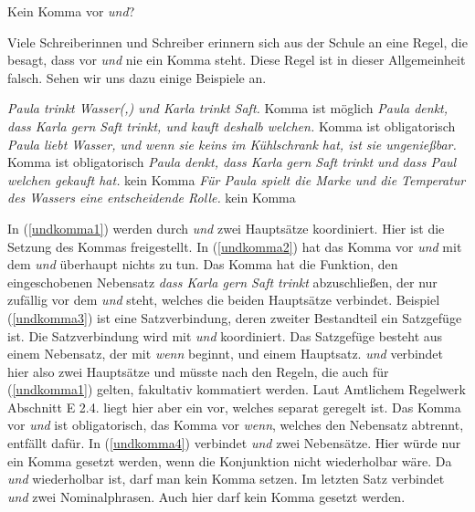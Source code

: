 \ea \label{ex:Legitimation2}
\z
\z




\begin{Exkurs}{Kein Komma vor \textit{und}?}

Viele Schreiberinnen und Schreiber erinnern sich aus der Schule an eine Regel, die besagt, dass vor \textit{und} nie ein Komma steht. Diese Regel ist in dieser Allgemeinheit falsch. Sehen wir uns dazu einige Beispiele an.


\ea 
\ea \textit{Paula trinkt Wasser(,) und Karla trinkt Saft.} \rightarrow  Komma ist möglich \label{undkomma1}
\ex \textit{Paula denkt, dass Karla gern Saft trinkt, und kauft deshalb welchen.} \rightarrow  Komma ist obligatorisch \label{undkomma2}
\ex \textit{Paula liebt Wasser, und wenn sie keins im Kühlschrank hat, ist sie ungenießbar.} \rightarrow  Komma ist obligatorisch \label{undkomma3}
\ex \textit{Paula denkt, dass Karla gern Saft trinkt und dass Paul welchen gekauft hat.} \rightarrow  kein Komma \label{undkomma4}
\ex \textit{Für Paula spielt die Marke und die Temperatur des Wassers eine entscheidende Rolle.} \rightarrow  kein Komma \label{undkomma5}
\z
\z


In (\ref{undkomma1}) werden durch \textit{und} zwei Hauptsätze koordiniert. Hier ist die Setzung des Kommas freigestellt. In (\ref{undkomma2}) hat das Komma vor \textit{und} mit dem \textit{und} überhaupt nichts zu tun. Das Komma hat die Funktion, den eingeschobenen Nebensatz \textit{dass Karla gern Saft trinkt} abzuschließen, der nur zufällig vor dem \textit{und} steht, welches die beiden Hauptsätze verbindet. Beispiel (\ref{undkomma3}) ist eine Satzverbindung, deren zweiter Bestandteil ein Satzgefüge ist. Die Satzverbindung wird mit \textit{und} koordiniert. Das Satzgefüge besteht aus einem Nebensatz, der mit \textit{wenn} beginnt, und einem Hauptsatz. \textit{und }verbindet hier also zwei Hauptsätze und müsste nach den Regeln, die auch für (\ref{undkomma1}) gelten, fakultativ kommatiert werden. Laut Amtlichem Regelwerk Abschnitt E 2.4. liegt hier aber ein  vor, welches separat geregelt ist. Das Komma vor \textit{und} ist obligatorisch, das Komma vor \textit{wenn}, welches den Nebensatz abtrennt, entfällt dafür. In (\ref{undkomma4}) verbindet \textit{und} zwei Nebensätze. Hier würde nur ein Komma gesetzt werden, wenn die Konjunktion nicht wiederholbar wäre. Da \textit{und} wiederholbar ist, darf man kein Komma setzen. Im letzten Satz verbindet \textit{und} zwei Nominalphrasen. Auch hier darf kein Komma gesetzt werden.


\end{Exkurs}
